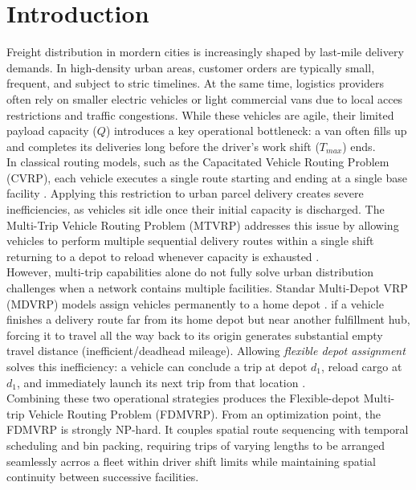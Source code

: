 \documentclass[conference]{IEEEtran}
\begin{document}
\section{Introduction}
Freight distribution in mordern cities is increasingly shaped by last-mile delivery demands. In high-density urban areas, customer orders are typically small, frequent, and subject to stric timelines. At the same time, logistics providers often rely on smaller electric vehicles or light commercial vans due to local acces restrictions and traffic congestions. While these vehicles are agile, their limited payload capacity ($Q$) introduces a key operational bottleneck: a van often fills up and completes its deliveries long before the driver's work shift ($T_{max}$) ends.\\
In classical routing models, such as the Capacitated Vehicle Routing Problem (CVRP), each vehicle executes a single route starting and ending at a single base facility \cite{cordeau1997tabu}. Applying this restriction to urban parcel delivery creates severe inefficiencies, as vehicles sit idle once their initial capacity is discharged. The Multi-Trip Vehicle Routing Problem (MTVRP) addresses this issue by allowing vehicles to perform multiple sequential delivery routes within a single shift returning to a depot to reload whenever capacity is exhausted \cite{taillard1996vehicle, cattaruzza2018survey}.\\
However, multi-trip capabilities alone do not fully solve urban distribution challenges when a network contains multiple facilities. Standar Multi-Depot VRP (MDVRP) models assign vehicles permanently to a home depot \cite{cordeau1997tabu}. if a vehicle finishes a delivery route far from its home depot but near another fulfillment hub, forcing it to travel all the way back to its origin generates substantial empty travel distance (inefficient/deadhead mileage). Allowing \textit{flexible depot assignment} solves this inefficiency: a vehicle can conclude a trip at depot $d_1$, reload cargo at $d_1$, and immediately launch its next trip from that location \cite{crevier2007multi, li2026multidepot}.\\
Combining these two operational strategies produces the Flexible-depot Multi-trip Vehicle Routing Problem (FDMVRP). From an optimization point, the FDMVRP is strongly NP-hard. It couples spatial route sequencing with temporal scheduling and bin packing, requiring trips of varying lengths to be arranged seamlessly acrros a fleet within driver shift limits while maintaining spatial continuity between successive facilities.\\
\end{document}
